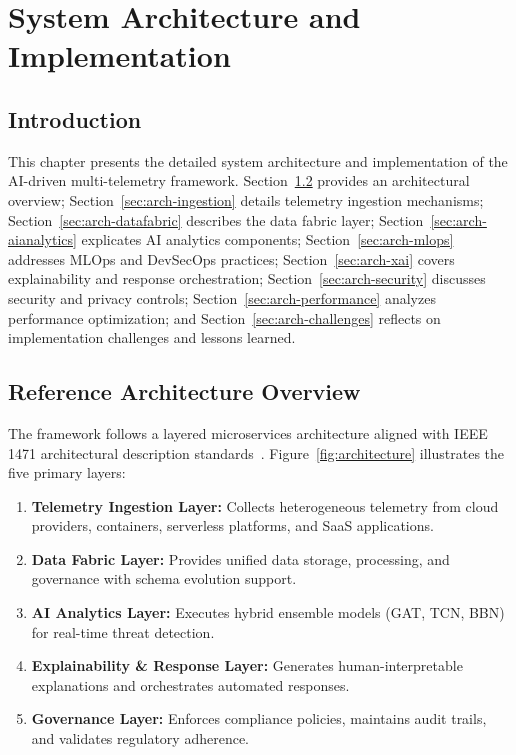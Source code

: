 \chapter{System Architecture and Implementation}\label{chap:arch}

\section{Introduction}\label{sec:arch-intro}
This chapter presents the detailed system architecture and implementation of the AI-driven multi-telemetry framework. Section~\ref{sec:arch-overview} provides an architectural overview; Section~\ref{sec:arch-ingestion} details telemetry ingestion mechanisms; Section~\ref{sec:arch-datafabric} describes the data fabric layer; Section~\ref{sec:arch-aianalytics} explicates AI analytics components; Section~\ref{sec:arch-mlops} addresses MLOps and DevSecOps practices; Section~\ref{sec:arch-xai} covers explainability and response orchestration; Section~\ref{sec:arch-security} discusses security and privacy controls; Section~\ref{sec:arch-performance} analyzes performance optimization; and Section~\ref{sec:arch-challenges} reflects on implementation challenges and lessons learned.

\section{Reference Architecture Overview}\label{sec:arch-overview}
The framework follows a layered microservices architecture aligned with IEEE 1471 architectural description standards~\cite{ieee1471}. Figure~\ref{fig:architecture} illustrates the five primary layers:

\begin{enumerate}
    \item \textbf{Telemetry Ingestion Layer:} Collects heterogeneous telemetry from cloud providers, containers, serverless platforms, and SaaS applications.
    \item \textbf{Data Fabric Layer:} Provides unified data storage, processing, and governance with schema evolution support.
    \item \textbf{AI Analytics Layer:} Executes hybrid ensemble models (GAT, TCN, BBN) for real-time threat detection.
    \item \textbf{Explainability \& Response Layer:} Generates human-interpretable explanations and orchestrates automated responses.
    \item \textbf{Governance Layer:} Enforces compliance policies, maintains audit trails, and validates regulatory adherence.
\end{enumerate}

